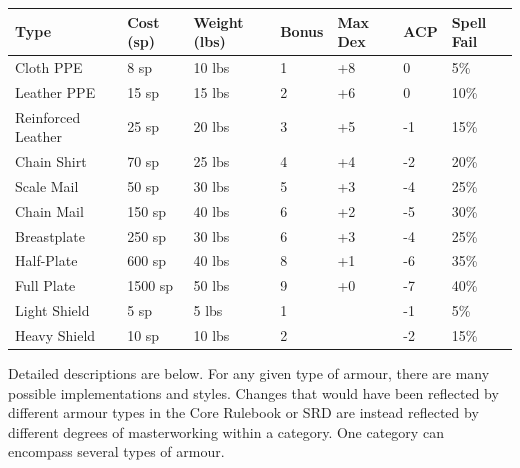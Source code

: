 \begin{tabular}{|l|ll|l|lll|}\hline
\textbf{Type} & \textbf{Cost (sp)} & \textbf{Weight (lbs)} &
\textbf{Bonus} & \textbf{Max Dex} & \textbf{ACP} & \textbf{Spell Fail} \\
\hline
Cloth PPE &
8 sp & 10 lbs & 1 & +8 & 0 & 5\% \\
Leather PPE &
15 sp & 15 lbs & 2 & +6 & 0 & 10\% \\
Reinforced Leather &
25 sp & 20 lbs & 3 & +5 & -1 & 15\% \\
Chain Shirt &
70 sp & 25 lbs & 4 & +4 & -2 & 20\% \\
\hline
Scale Mail &
50 sp & 30 lbs & 5 & +3 & -4 & 25\% \\
Chain Mail &
150 sp & 40 lbs & 6 & +2 & -5 & 30\% \\
Breastplate &
250 sp & 30 lbs & 6 & +3 & -4 & 25\% \\
\hline
Half-Plate &
600 sp & 40 lbs & 8 & +1 & -6 & 35\% \\
Full Plate &
1500 sp & 50 lbs & 9 & +0 & -7 & 40\% \\
\hline
Light Shield &
5 sp & 5 lbs & 1 & & -1 & 5\% \\
Heavy Shield &
10 sp & 10 lbs & 2 & & -2 & 15\% \\
\hline
\end{tabular}

Detailed descriptions are below. For any given type of armour, there are
many possible implementations and styles. Changes that would have been
reflected by different armour types in the Core Rulebook or SRD are instead
reflected by different degrees of masterworking within a category. One
category can encompass several types of armour.

